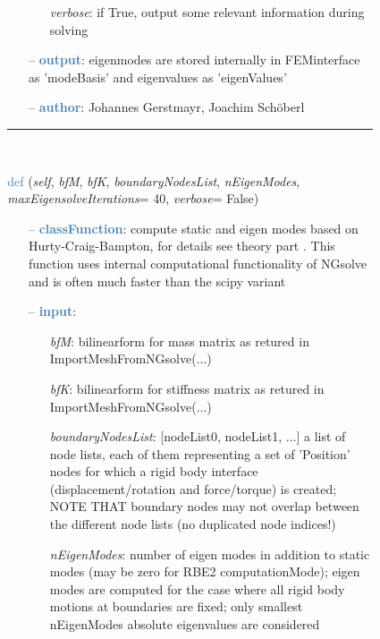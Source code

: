 \begin{itemize}[leftmargin=1.4cm]
\begin{itemize}[leftmargin=0.5cm]
\begin{itemize}[leftmargin=1.4cm]
\begin{itemize}[leftmargin=0.5cm]
\begin{itemize}[leftmargin=0.7cm]
\begin{itemize}[leftmargin=1.2cm]
    \item[] {\it   verbose}: if True, output some relevant information during solving
  \end{itemize}
  \item[--]  \textcolor{steelblue}{\bf output}: eigenmodes are stored internally in FEMinterface as 'modeBasis' and eigenvalues as 'eigenValues'  \item[--]  \textcolor{steelblue}{\bf author}: Johannes Gerstmayr, Joachim Sch\"oberl\vspace{12pt}\end{itemize}
%
\noindent\rule{8cm}{0.75pt}\vspace{1pt} \\ 
\begin{flushleft}
\noindent \textcolor{steelblue}{def {\bf {}}}\label{sec:FEM:FEMinterface:ComputeHurtyCraigBamptonModesNGsolve}
({\it self}, {\it bfM}, {\it bfK}, {\it boundaryNodesList}, {\it nEigenModes}, {\it maxEigensolveIterations}= 40, {\it verbose}= False)
\end{flushleft}
\setlength{\itemindent}{0.7cm}
\begin{itemize}[leftmargin=0.7cm]
  \item[--]  \textcolor{steelblue}{\bf classFunction}: compute static  and eigen modes based on Hurty-Craig-Bampton, for details see theory part . This function uses internal computational functionality of NGsolve and is often much faster than the scipy variant  \item[--]  \textcolor{steelblue}{\bf input}: \vspace{-6pt}
  \begin{itemize}[leftmargin=1.2cm]
\setlength{\itemindent}{-0.7cm}
    \item[] {\it bfM}: bilinearform for mass matrix as retured in ImportMeshFromNGsolve(...)
    \item[] {\it   bfK}: bilinearform for stiffness matrix as retured in ImportMeshFromNGsolve(...)
    \item[] {\it   boundaryNodesList}: [nodeList0, nodeList1, ...] a list of node lists, each of them representing a set of 'Position' nodes for which a rigid body interface (displacement/rotation and force/torque) is created; NOTE THAT boundary nodes may not overlap between the different node lists (no duplicated node indices!)
    \item[] {\it   nEigenModes}: number of eigen modes in addition to static modes (may be zero for RBE2 computationMode); eigen modes are computed for the case where all rigid body motions at boundaries are fixed; only smallest nEigenModes absolute eigenvalues are considered

\end{itemize}
\end{itemize}
\end{itemize}
\end{itemize}
\end{itemize}
\end{itemize}
